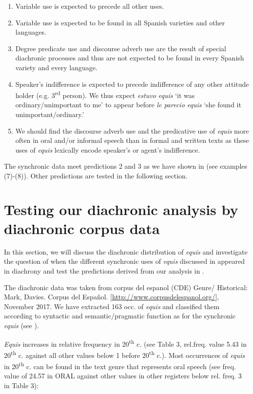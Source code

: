 \documentclass[output=paper
,modfonts
,nonflat]{langsci/langscibook}
\begin{document}
\begin{enumerate}
	\item Variable use is expected to precede all other uses.
	\item Variable use is expected to be found in all Spanish varieties and other languages.
	\item Degree predicate use and discourse adverb use are the result of special diachronic processes and thus are not expected to be found in every Spanish variety and every language.
	\item Speaker’s indifference is expected to precede indifference of any other attitude holder (e.g. 3\textsuperscript{rd} person). We thus expect \textit{estuvo equis} ‘it was ordinary/unimportant to me’ to appear before \textit{le parecio equis} ‘she found it unimportant/ordinary.’
	\item We should find the discourse adverb use and the predicative use of \textit{equis} more often in oral and/or informal speech than in formal and written texts as these uses of \textit{equis} lexically encode speaker’s or agent’s indifference.
\end{enumerate}

The synchronic data meet predictions 2 and 3 as we have shown in  (see examples (7)-(8)). Other predictions are tested in the following section.

\section{Testing our diachronic analysis by diachronic corpus data}\label{sec:kellert:5}
In this section, we will discuss the diachronic distribution of \textit{equis} and investigate the question of when the different synchronic uses of \textit{equis} discussed in  appeared in diachrony and test the predictions derived from our analysis in .

The diachronic data was taken from corpus del espanol (CDE) Genre/ Historical: Mark, Davies. Corpus del Español. [\href{http://www.corpusdelespanol.org/}{http://www.corpusdelespanol.org/}], November 2017. We have extracted 163 occ. of \textit{equis} and classified them according to syntactic and semantic/pragmatic function as for the synchronic \textit{equis} (see ).

\textit{Equis} increases in relative frequency in 20\textsuperscript{th} c. (see Table 3, rel.freq. value 5.43 in 20\textsuperscript{th} c. against all other values below 1 before 20\textsuperscript{th} c.). Most occurrences of \textit{equis} in 20\textsuperscript{th} c. can be found in the text genre that represents oral speech (see freq. value of 24.57 in ORAL against other values in other registers below rel. freq. 3 in Table 3):
\end{document}
